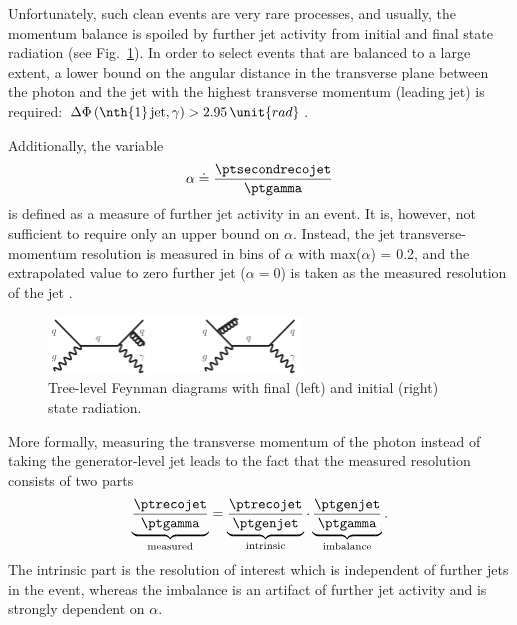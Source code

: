 Unfortunately, such clean events are very rare processes, and usually, the momentum balance is spoiled by further jet activity from initial and final state radiation (see Fig.~\ref{res:fig:FeynmanDiagramsWithRadiation}). 
In order to select events that are balanced to a large extent, a lower bound on the angular distance in the transverse plane between the photon and the jet with the highest transverse momentum (leading jet) is required: $\Delta\Phi \left(\text{\nth{1}\,jet,\,} \gamma \right)>2.95\,\unit{rad}$. 

Additionally, the variable 
\begin{equation*}
\label{res:eq:alphaDef}
\alpha \doteq \frac{\ptsecondrecojet}{\ptgamma}
\end{equation*} 
is defined as a measure of further jet activity in an event. 
It is, however, not sufficient to require only an upper bound on $\alpha$. 
Instead, the jet transverse-momentum resolution is measured in bins of $\alpha$ with max($\alpha$) = 0.2, 
and the extrapolated value to zero further jet \pt ($\alpha=0$) is taken as the measured resolution of the jet \pt. %
\begin{figure}[t]
  \centering
      \includegraphics[width=0.60\textwidth]{figures/resolution/generalApproach/FeynmanDiagramsWithRadiation.pdf}
  \caption{Tree-level Feynman diagrams with final (left) and initial (right) state radiation.}  
  \label{res:fig:FeynmanDiagramsWithRadiation}
\end{figure}

More formally, measuring the transverse momentum of the photon instead of taking the generator-level jet \pt leads to the fact that the measured resolution consists of two parts
\begin{equation*}\label{res:eq:splitting}
\underbrace{\frac{\ptrecojet}{\ptgamma}}_{\text{measured}} = \underbrace{\frac{\ptrecojet}{\ptgenjet}}_{\text{intrinsic}} \cdot \underbrace{\frac{\ptgenjet}{\ptgamma}}_{\text{imbalance}}.
\end{equation*}
The intrinsic part is the resolution of interest which is independent of further jets in the event, whereas the imbalance is an artifact of further jet activity and is strongly dependent on $\alpha$.


